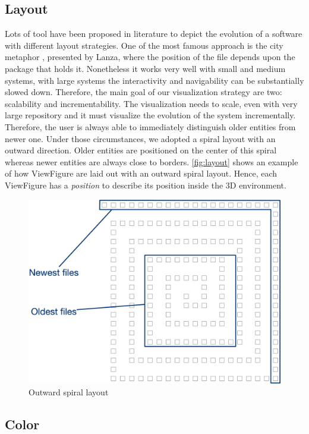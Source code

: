 \subsection*{Layout}
Lots of tool have been proposed in literature to depict the evolution of a software with different layout strategies. 
One of the most famous approach is the city metaphor \cite{Wettel2007}, presented by Lanza, where the position of the file depends upon the package that holds it. 
Nonetheless it works very well with small and medium systems, with large systems the interactivity and navigability can be substantially slowed down.
\bigbreak
Therefore, the main goal of our visualization strategy are two: scalability and incrementability. The visualization needs to scale, even with very large repository and it must visualize the evolution of the system incrementally. Therefore, the user is always able to immediately distinguish older entities from newer one.
\bigbreak
Under those circumstances, we adopted a spiral layout with an outward direction. Older entities are positioned on the center of this spiral whereas newer entities are always close to borders. 
\autoref{fig:layout} shows an example of how ViewFigure are laid out with an outward spiral layout.
\bigbreak
Hence, each ViewFigure has a \textit{position} to describe its position inside the 3D environment. 

\begin{figure}
    \center
    \includegraphics[width=\textwidth]{SpiralLayout.jpg}
    \caption{Outward spiral layout}
    \label{fig:layout}
\end{figure}

\subsection*{Color}

